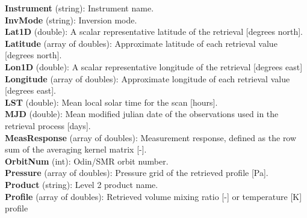 \textbf{Instrument} (string): Instrument name. \\ %

\textbf{InvMode} (string): Inversion mode. \\ %

\textbf{Lat1D} (double): A scalar representative latitude of the retrieval [degrees north]. \\ %

\textbf{Latitude} (array of doubles): Approximate latitude of each retrieval value [degrees north]. \\

\textbf{Lon1D} (double): A scalar representative longitude of the retrieval [degrees east] \\ %

\textbf{Longitude} (array of doubles): Approximate longitude of each retrieval value [degrees east]. \\

\textbf{LST} (double): Mean local solar time for the scan [hours]. \\ %

\textbf{MJD} (double): Mean modified julian date of the observations used in the retrieval process [days]. \\

\textbf{MeasResponse} (array of doubles): Measurement response, defined as the row sum of the averaging kernel matrix [-]. \\ %

\textbf{OrbitNum} (int): Odin/SMR orbit number. \\ %

\textbf{Pressure} (array of doubles): Pressure grid of the retrieved profile [Pa]. \\

\textbf{Product} (string): Level 2 product name. \\

\textbf{Profile} (array of doubles): Retrieved volume mixing ratio [-] or temperature [K] profile  \\ %

